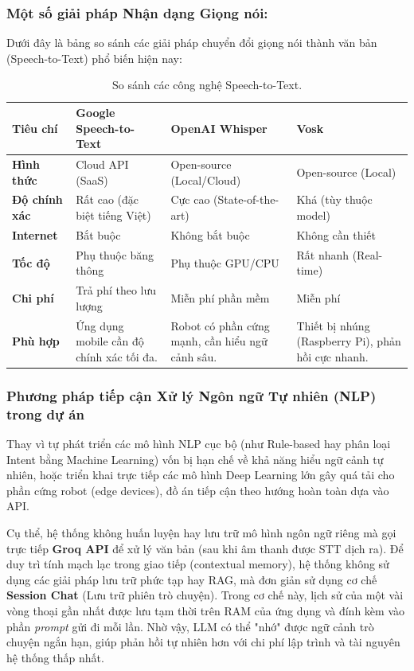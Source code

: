 \subsubsection{Một số giải pháp Nhận dạng Giọng nói:}

Dưới đây là bảng so sánh các giải pháp chuyển đổi giọng nói thành văn bản (Speech-to-Text) phổ biến hiện nay:

\begin{table}[htbp]
\centering
\small
\begin{tabularx}{\textwidth}{@{} l >{\raggedright\arraybackslash}X >{\raggedright\arraybackslash}X >{\raggedright\arraybackslash}X @{}}
\toprule
\textbf{Tiêu chí} & \textbf{Google Speech-to-Text} & \textbf{OpenAI Whisper} & \textbf{Vosk} \\ \midrule
\textbf{Hình thức} & Cloud API (SaaS) & Open-source (Local/Cloud) & Open-source (Local) \\
\textbf{Độ chính xác} & Rất cao (đặc biệt tiếng Việt) & Cực cao (State-of-the-art) & Khá (tùy thuộc model) \\
\textbf{Internet} & Bắt buộc & Không bắt buộc & Không cần thiết \\
\textbf{Tốc độ} & Phụ thuộc băng thông & Phụ thuộc GPU/CPU & Rất nhanh (Real-time) \\
\textbf{Chi phí} & Trả phí theo lưu lượng & Miễn phí phần mềm & Miễn phí \\
\textbf{Phù hợp} & Ứng dụng mobile cần độ chính xác tối đa. & Robot có phần cứng mạnh, cần hiểu ngữ cảnh sâu. & Thiết bị nhúng (Raspberry Pi), phản hồi cực nhanh. \\ \bottomrule
\end{tabularx}
\caption{So sánh các công nghệ Speech-to-Text.}
\end{table}

\subsubsection{Phương pháp tiếp cận Xử lý Ngôn ngữ Tự nhiên (NLP) trong dự án}

Thay vì tự phát triển các mô hình NLP cục bộ (như Rule-based hay phân loại Intent bằng Machine Learning) vốn bị hạn chế về khả năng hiểu ngữ cảnh tự nhiên, hoặc triển khai trực tiếp các mô hình Deep Learning lớn gây quá tải cho phần cứng robot (edge devices), đồ án tiếp cận theo hướng hoàn toàn dựa vào API.

Cụ thể, hệ thống không huấn luyện hay lưu trữ mô hình ngôn ngữ riêng mà gọi trực tiếp \textbf{Groq API} để xử lý văn bản (sau khi âm thanh được STT dịch ra). Để duy trì tính mạch lạc trong giao tiếp (contextual memory), hệ thống không sử dụng các giải pháp lưu trữ phức tạp hay RAG, mà đơn giản sử dụng cơ chế \textbf{Session Chat} (Lưu trữ phiên trò chuyện). Trong cơ chế này, lịch sử của một vài vòng thoại gần nhất được lưu tạm thời trên RAM của ứng dụng và đính kèm vào phần \textit{prompt} gửi đi mỗi lần. Nhờ vậy, LLM có thể "nhớ" được ngữ cảnh trò chuyện ngắn hạn, giúp phản hồi tự nhiên hơn với chi phí lập trình và tài nguyên hệ thống thấp nhất.



